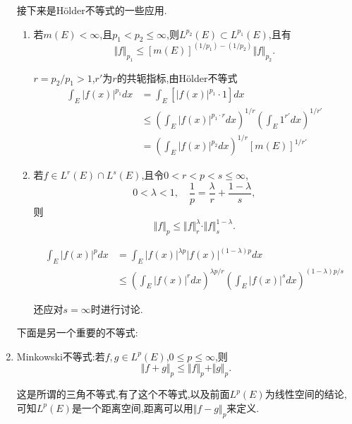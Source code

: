 \documentclass[12pt,a4paper,openany]{book}
\begin{document}
\begin{enumerate}
接下来是H\"older不等式的一些应用.

\begin{enumerate}
\item 若$m(E) < \infty$,且$p_1 < p_2 \le \infty$,则$L^{p_2}(E) \subset L^{p_1}(E)$,且有
\[
\Vert{f}\Vert_{p_1} \le [m(E)]^{(1/p_1) - (1/p_2)}\Vert{f}\Vert_{p_2}.
\]

$r = p_2/p_1>1$,$r'$为$r$的共轭指标,由H\"older不等式
\[
\begin{aligned}
\int_{E}{|f(x)|^{p_1}dx} &= \int_{E}{[|f(x)|^{p_1} \cdot 1]dx} \\
&\le(\int_{E}{|f(x)|^{p_1 \cdot r}dx})^{1/r}(\int_{E}{1^{r'}dx})^{1/r'} \\
&=(\int_{E}{|f(x)|^{p_2}dx})^{1/r}[m(E)]^{1/r'}
\end{aligned}
\]

\item 若$f \in L^r(E) \cap L^{s}(E)$,且令$0<r<p<s\le\infty$,
\[
0 < \lambda < 1,\quad \frac{1}{p} = \frac{\lambda}{r} + \frac{1 - \lambda}{s},
\]
则
\[
\Vert{f}\Vert_{p} \le \Vert{f}\Vert_{r}^{\lambda} \cdot \Vert{f}\Vert_{s}^{1 - \lambda}.
\]

\[
\begin{aligned}
\int_{E}{|f(x)|^pdx} &= \int_{E}{|f(x)|^{\lambda{}p}|f(x)|^{(1 - \lambda)p}dx} \\
&\le (\int_{E}{|f(x)|^rdx})^{\lambda{p}/r}(\int_{E}{|f(x)|^sdx})^{(1-\lambda)p/s}
\end{aligned}
\]

还应对$s = \infty$时进行讨论.

\end{enumerate}

下面是另一个重要的不等式:

\item Minkowski不等式:若$f, g \in L^p(E)$,$0 \le p \le \infty$,则
\[
\Vert{f+g}\Vert_p \le \Vert{f}\Vert_p + \Vert{g}\Vert_p.
\]

这是所谓的三角不等式,有了这个不等式,以及前面$L^p(E)$为线性空间的结论,可知$L^p(E)$是一个距离空间,距离可以用$\Vert{f-g}\Vert_p$来定义.


\end{enumerate}
\end{document}
